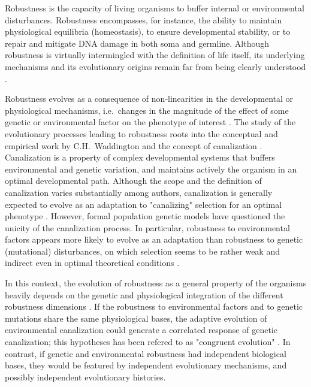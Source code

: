 \documentclass[10pt,a4paper]{article}
\begin{document}
Robustness is the capacity of living organisms to buffer internal or environmental disturbances. Robustness encompasses, for instance, the ability to maintain physiological equilibria (homeostasis), to ensure developmental stability, or to repair and mitigate DNA damage in both soma and germline. Although robustness is virtually intermingled with the definition of life itself, its underlying mechanisms and its evolutionary origins remain far from being clearly understood \citep{Ste02,MS09,Wag13,HGK+19}. 

Robustness evolves as a consequence of non-linearities in the developmental or physiological mechanisms, i.e.\ changes in the magnitude of the effect of some genetic or environmental factor on the phenotype of interest \citep{Nij02}. The study of the evolutionary processes leading to robustness roots into the conceptual and empirical work by C.H.\ Waddington and the concept of canalization \citep{Wad42,Sch49,Wad59,Loi19}. Canalization is a property of complex developmental systems that buffers environmental and genetic variation, and maintains actively the organism in an optimal developmental path. Although the scope and the definition of canalization varies substantially among authors, canalization is generally expected to evolve as an adaptation to "canalizing" selection for an optimal phenotype \citep{EM98,DD01,Fla05,Kli19}. However, formal population genetic models have questioned the unicity of the canalization process. In particular, robustness to environmental factors appears more likely to evolve as an adaptation than robustness to genetic (mutational) disturbances, on which selection seems to be rather weak and indirect even in optimal theoretical conditions \citep{WBB97, HHW03,LAH13}. 

In this context, the evolution of robustness as a general property of the organisms heavily depends on the genetic and physiological integration of the different robustness dimensions \citep{Far15}. If the robustness to environmental factors and to genetic mutations share the same physiological bases, the adaptive evolution of environmental canalization could generate a correlated response of genetic canalization; this hypotheses has been refered to as "congruent evolution" \citep{dHW+03}. In contrast, if genetic and environmental robustness had independent biological bases, they would be featured by independent evolutionary mechanisms, and possibly independent evolutionary histories. 
\end{document}
